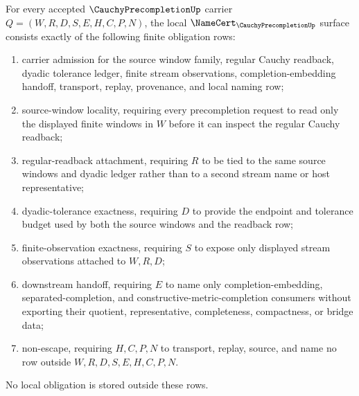 \begin{theorem}
\label{thm:cauchy-precompletion-namecert-obligations}
For every accepted $\CauchyPrecompletionUp$ carrier $Q=(W,R,D,S,E,H,C,P,N)$, the local $\NameCert_{\CauchyPrecompletionUp}$ surface consists exactly of the following finite obligation rows:
\begin{enumerate}
\item carrier admission for the source window family, regular Cauchy readback, dyadic tolerance ledger, finite stream observations, completion-embedding handoff, transport, replay, provenance, and local naming row;
\item source-window locality, requiring every precompletion request to read only the displayed finite windows in $W$ before it can inspect the regular Cauchy readback;
\item regular-readback attachment, requiring $R$ to be tied to the same source windows and dyadic ledger rather than to a second stream name or host representative;
\item dyadic-tolerance exactness, requiring $D$ to provide the endpoint and tolerance budget used by both the source windows and the readback row;
\item finite-observation exactness, requiring $S$ to expose only displayed stream observations attached to $W,R,D$;
\item downstream handoff, requiring $E$ to name only completion-embedding, separated-completion, and constructive-metric-completion consumers without exporting their quotient, representative, completeness, compactness, or bridge data;
\item non-escape, requiring $H,C,P,N$ to transport, replay, source, and name no row outside $W,R,D,S,E,H,C,P,N$.
\end{enumerate}
No local obligation is stored outside these rows.
\end{theorem}
